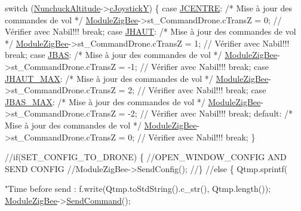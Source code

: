 \begin{DoxyCode}
        \textcolor{keywordflow}{switch} (\hyperlink{classQBase_a615289f4d92be86986421ec16182ed90}{NunchuckAltitude}->\hyperlink{classNunchuck_aaf0f299016f5acf686f716518a7ce567}{cJoystickY}) \{
        \textcolor{keywordflow}{case} \hyperlink{nunchuck_8h_ac63506adba6ed764c5061ac249623554}{JCENTRE}:
            \textcolor{comment}{/* Mise à jour des commandes de vol */}
            \hyperlink{classQBase_a466b6191fec7cd0029dfc547a5437752}{ModuleZigBee}->st\_CommandDrone.cTransZ = 0;    \textcolor{comment}{//
      Vérifier avec Nabil!!!}
            \textcolor{keywordflow}{break};
        \textcolor{keywordflow}{case} \hyperlink{nunchuck_8h_a624208e4279eb8508e4d7a4cd1983293}{JHAUT}:
            \textcolor{comment}{/* Mise à jour des commandes de vol */}
            \hyperlink{classQBase_a466b6191fec7cd0029dfc547a5437752}{ModuleZigBee}->st\_CommandDrone.cTransZ = 1;    \textcolor{comment}{//
      Vérifier avec Nabil!!!}
            \textcolor{keywordflow}{break};
        \textcolor{keywordflow}{case} \hyperlink{nunchuck_8h_ad9a8fe51b03c91dc0256cc7502d450a3}{JBAS}:
            \textcolor{comment}{/* Mise à jour des commandes de vol */}
            \hyperlink{classQBase_a466b6191fec7cd0029dfc547a5437752}{ModuleZigBee}->st\_CommandDrone.cTransZ = -1;    \textcolor{comment}{//
      Vérifier avec Nabil!!!}
            \textcolor{keywordflow}{break};
        \textcolor{keywordflow}{case} \hyperlink{nunchuck_8h_a69c726c7ddc8415a81ea58834356ed2b}{JHAUT\_MAX}:
            \textcolor{comment}{/* Mise à jour des commandes de vol */}
            \hyperlink{classQBase_a466b6191fec7cd0029dfc547a5437752}{ModuleZigBee}->st\_CommandDrone.cTransZ = 2;    \textcolor{comment}{//
      Vérifier avec Nabil!!!}
            \textcolor{keywordflow}{break};
        \textcolor{keywordflow}{case} \hyperlink{nunchuck_8h_a8bd0c46505c3f0a7d5bc412d8a56d41a}{JBAS\_MAX}:
            \textcolor{comment}{/* Mise à jour des commandes de vol */}
            \hyperlink{classQBase_a466b6191fec7cd0029dfc547a5437752}{ModuleZigBee}->st\_CommandDrone.cTransZ = -2;    \textcolor{comment}{//
      Vérifier avec Nabil!!!}
            \textcolor{keywordflow}{break};
        \textcolor{keywordflow}{default}:
            \textcolor{comment}{/* Mise à jour des commandes de vol */}
            \hyperlink{classQBase_a466b6191fec7cd0029dfc547a5437752}{ModuleZigBee}->st\_CommandDrone.cTransZ = 0;    \textcolor{comment}{//
      Vérifier avec Nabil!!!}
            \textcolor{keywordflow}{break};
        \}

        \textcolor{comment}{//if(SET\_CONFIG\_TO\_DRONE) \{}
            \textcolor{comment}{//OPEN\_WINDOW\_CONFIG AND SEND CONFIG}
            \textcolor{comment}{//ModuleZigBee->SendConfig();}
        \textcolor{comment}{//\}}
        \textcolor{comment}{//else \{}
            Qtmp.sprintf(\textcolor{stringliteral}{"Time before send : %
            f.write(Qtmp.toStdString().c\_str(), Qtmp.length());
            \hyperlink{classQBase_a466b6191fec7cd0029dfc547a5437752}{ModuleZigBee}->\hyperlink{classZigBee_a6b69e04be626400b5b245fa1b56f0810}{SendCommand}();

}
\end{DoxyCode}
